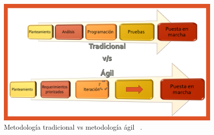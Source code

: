 \begin{figure}[h]
  \includegraphics[width=\textwidth]{Imagenes/tradicional_vs_agil.png}
  \caption{\label{fig: dif_Metodologia} Metodología tradicional vs metodología ágil  ~\cite{5}.}
\end{figure}


